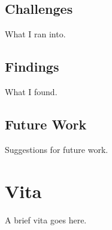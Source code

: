 \documentclass[final]{ukthesis}
\begin{document}
\section{Challenges}
What I ran into.

\section{Findings}
What I found.

\section{Future Work}
Suggestions for future work.




\copyrightnotice
\backmatter

\chapter{Vita}
A brief vita goes here.
\end{document}
